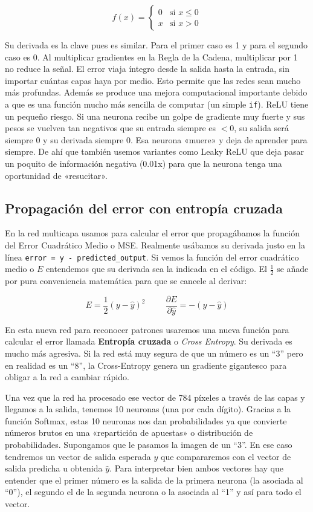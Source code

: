 \documentclass[a4paper,11pt]{article}
\begin{document}
\[
f(x) = \begin{cases} 
      0 & \text{si } x \le 0 \\
      x & \text{si } x > 0 
   \end{cases}
\]

Su derivada es la clave pues es similar. Para el primer caso es 1 y para
el segundo caso es 0. Al multiplicar gradientes en la Regla de la
Cadena, multiplicar por 1 no reduce la señal. El error viaja íntegro
desde la salida hasta la entrada, sin importar cuántas capas haya por
medio. Esto permite que las redes sean mucho más profundas. Además se
produce una mejora computacional importante debido a que es una función
mucho más sencilla de computar (un simple \texttt{if}). ReLU tiene un
pequeño riesgo. Si una neurona recibe un golpe de gradiente muy fuerte y
sus pesos se vuelven tan negativos que su entrada siempre es \(<0\), su
salida será siempre 0 y su derivada siempre 0. Esa neurona «muere» y
deja de aprender para siempre. De ahí que también usemos variantes como
Leaky ReLU que deja pasar un poquito de información negativa (0.01x)
para que la neurona tenga una oportunidad de «resucitar».


\subsection{Propagación del error con entropía cruzada}

En la red multicapa usamos para calcular el error que propagábamos la
función del Error Cuadrático Medio o MSE. Realmente usábamos su derivada
justo en la línea \texttt{error\ =\ y\ -\ predicted\_output}. Si vemos
la función del error cuadrático medio o \(E\) entendemos que su derivada
sea la indicada en el código. El \(\frac{1}{2}\) se añade por pura
conveniencia matemática para que se cancele al derivar:

\[
E = \frac{1}{2}(y - \hat{y})^2 \hspace{1cm} \frac{\partial E}{\partial \hat{y}} = -(y - \hat{y})
\]

En esta nueva red para reconocer patrones usaremos una nueva función
para calcular el error llamada \textbf{Entropía cruzada} o \emph{Cross
Entropy}. Su derivada es mucho más agresiva. Si la red está muy segura
de que un número es un ``3'' pero en realidad es un ``8'', la
Cross-Entropy genera un gradiente gigantesco para obligar a la red a
cambiar rápido.

Una vez que la red ha procesado ese vector de 784 píxeles a través de
las capas y llegamos a la salida, tenemos 10 neuronas (una por cada
dígito). Gracias a la función Softmax, estas 10 neuronas nos dan
probabilidades ya que convierte números brutos en una «repartición de
apuestas» o distribución de probabilidades. Supongamos que le pasamos la
imagen de un ``3''. En ese caso tendremos un vector de salida esperada
\(y\) que compararemos con el vector de salida predicha u obtenida
\(\hat{y}\). Para interpretar bien ambos vectores hay que entender que
el primer número es la salida de la primera neurona (la asociada al
``0''), el segundo el de la segunda neurona o la asociada al ``1'' y así
para todo el vector.
\end{document}
